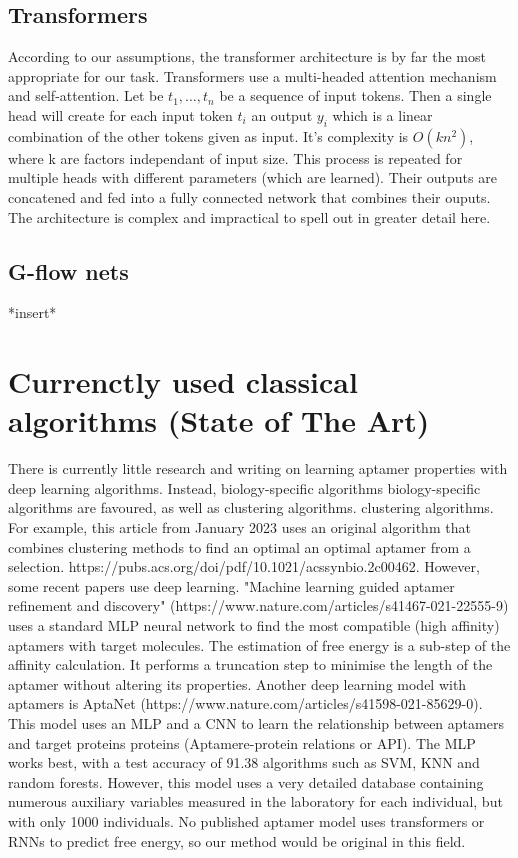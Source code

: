 \documentclass{article}
\begin{document}
\subsection*{Transformers}
According to our assumptions, the transformer 
architecture \cite{transformers} is by far the most appropriate
for our task. Transformers use a multi-headed 
attention mechanism and self-attention. Let
be $t_1, \dots, t_n$ be a sequence of input tokens. Then a single 
head will create for each input token $t_i$ an output $y_i$ which is a 
linear combination of the other tokens given as input. It's complexity
is $O(kn^2)$, where k are factors independant of input size. This process is 
repeated for multiple heads with different parameters (which are learned). Their
outputs are concatened and fed into a fully connected network that combines 
their ouputs. The architecture is complex and impractical to spell out
in greater detail here.

\subsection*{G-flow nets}
*insert*

\section*{Currenctly used classical algorithms (State of The Art)}
There is currently little research and writing on learning 
aptamer properties with deep learning algorithms. Instead, biology-specific algorithms 
biology-specific algorithms are favoured, as well as clustering algorithms. 
clustering algorithms. For example, this article from January 2023 uses 
an original algorithm that combines clustering methods to find an optimal 
an optimal aptamer from a selection. 
https://pubs.acs.org/doi/pdf/10.1021/acssynbio.2c00462.
However, some recent papers use deep learning. 
"Machine learning guided aptamer refinement 
and discovery" (https://www.nature.com/articles/s41467-021-22555-9) 
uses a standard MLP neural network to find the most compatible (high affinity) aptamers with target molecules. The estimation of free energy is a sub-step of the affinity calculation. It performs a 
truncation step to minimise the length of the aptamer without altering its properties. 
Another deep learning model with aptamers is AptaNet 
(https://www.nature.com/articles/s41598-021-85629-0). This model uses an 
MLP and a CNN to learn the relationship between aptamers and target proteins 
proteins (Aptamere-protein relations or API). The MLP works best, with a 
test accuracy of 91.38%
algorithms such as SVM, KNN and random forests. However, this model 
uses a very detailed database containing numerous auxiliary variables 
measured in the laboratory for each individual, but with only 1000 individuals. 
No published aptamer model uses transformers or RNNs to predict free energy, so our method would be original in this field.


\end{document}
